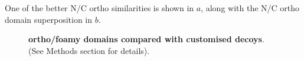 One of the better N/C ortho similarities is shown in $a$, along with the
N/C ortho domain superposition in $b$.
%
%
%
%
%
%
 
\begin{figure}
\centering
{}
\begin{footnotesize}
\caption{
\label{Fig:fitsNC}
{\bf ortho/foamy domains compared with customised decoys}.
(See Methods section for details).
}
\end{footnotesize}
\end{figure}

